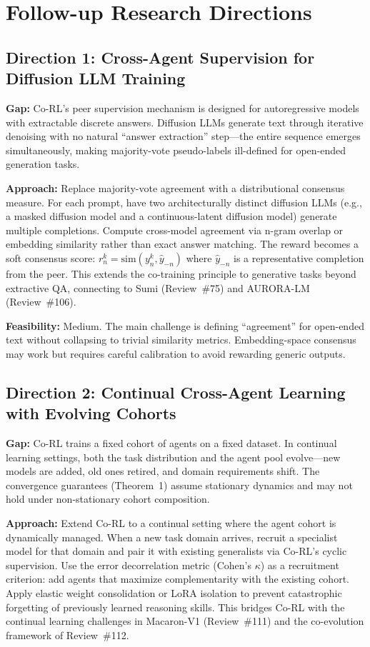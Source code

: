 \documentclass[11pt,a4paper]{article}
\begin{document}
\section{Follow-up Research Directions}

\subsection{Direction 1: Cross-Agent Supervision for Diffusion LLM Training}
\textbf{Gap:} Co-RL's peer supervision mechanism is designed for autoregressive models with extractable discrete answers. Diffusion LLMs generate text through iterative denoising with no natural ``answer extraction'' step---the entire sequence emerges simultaneously, making majority-vote pseudo-labels ill-defined for open-ended generation tasks.

\textbf{Approach:} Replace majority-vote agreement with a distributional consensus measure. For each prompt, have two architecturally distinct diffusion LLMs (e.g., a masked diffusion model and a continuous-latent diffusion model) generate multiple completions. Compute cross-model agreement via n-gram overlap or embedding similarity rather than exact answer matching. The reward becomes a soft consensus score: $r_n^k = \text{sim}(y_n^k, \hat{y}_{-n})$ where $\hat{y}_{-n}$ is a representative completion from the peer. This extends the co-training principle to generative tasks beyond extractive QA, connecting to Sumi (Review~\#75) and AURORA-LM (Review~\#106).

\textbf{Feasibility:} Medium. The main challenge is defining ``agreement'' for open-ended text without collapsing to trivial similarity metrics. Embedding-space consensus may work but requires careful calibration to avoid rewarding generic outputs.

\subsection{Direction 2: Continual Cross-Agent Learning with Evolving Cohorts}
\textbf{Gap:} Co-RL trains a fixed cohort of agents on a fixed dataset. In continual learning settings, both the task distribution and the agent pool evolve---new models are added, old ones retired, and domain requirements shift. The convergence guarantees (Theorem~1) assume stationary dynamics and may not hold under non-stationary cohort composition.

\textbf{Approach:} Extend Co-RL to a continual setting where the agent cohort is dynamically managed. When a new task domain arrives, recruit a specialist model for that domain and pair it with existing generalists via Co-RL's cyclic supervision. Use the error decorrelation metric (Cohen's $\kappa$) as a recruitment criterion: add agents that maximize complementarity with the existing cohort. Apply elastic weight consolidation or LoRA isolation to prevent catastrophic forgetting of previously learned reasoning skills. This bridges Co-RL with the continual learning challenges in Macaron-V1 (Review~\#111) and the co-evolution framework of Review~\#112.
\end{document}
